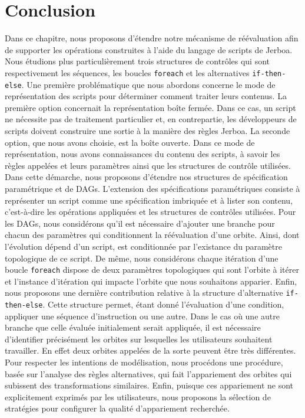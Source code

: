 \section{Conclusion}
\label{sec:reevaluation-scripts-conclusion}

Dans ce chapitre, nous proposons d'étendre notre mécanisme de réévaluation afin
de supporter les opérations construites à l'aide du langage de scripts de
Jerboa. %
Nous étudions plus particulièrement trois structures de contrôles qui sont
respectivement les séquences, les boucles \texttt{foreach} et les alternatives
\texttt{if-then-else}. %
Une première problématique que nous abordons concerne le mode de représentation
des scripts pour déterminer comment traiter leurs contenus. %
La première option concernait la représentation boîte fermée. %
Dans ce cas, un script ne nécessite pas de traitement particulier et, en
contrepartie, les développeurs de scripts doivent construire une sortie à la
manière des règles Jerboa. %
La seconde option, que nous avons choisie, est la boîte ouverte. %
Dans ce mode de représentation, nous avons connaissances du contenu des scripts,
à savoir les règles appelées et leurs paramètres ainsi que les structures de
contrôle utilisées. %
Dans cette démarche, nous proposons d'étendre nos structures de spécification
paramétrique et de DAGs. %
L'extension des spécifications paramétriques consiste à représenter un script
comme une spécification imbriquée et à lister son contenu, c'est-à-dire les
opérations appliquées et les structures de contrôles utilisées. %
Pour les DAGs, nous considérons qu'il est nécessaire d'ajouter une branche pour
chacun des paramètres qui conditionnent la réévaluation d'une orbite. %
Ainsi, dont l'évolution dépend d'un script, est conditionnée par l'existance du
paramètre topologique de ce script. %
De même, nous considérons chaque itération d'une boucle \texttt{foreach} dispose
de deux paramètres topologiques qui sont l'orbite à itérer et l'instance
d'itération qui impacte l'orbite que nous souhaitons apparier. %
Enfin, nous proposons une dernière contribution relative à la structure
d'alternative \texttt{if-then-else}. %
Cette structure permet, étant donné l'évaluation d'une condition, appliquer une
séquence d'instruction ou une autre. %
Dans le cas où une autre branche que celle évaluée initialement serait
appliquée, il est nécessaire d'identifier précisément les orbites sur lesquelles
les utilisateurs souhaitent travailler. %
En effet deux orbites appelées de la sorte peuvent être très différentes. %
Pour respecter les intentions de modélisation, nous procédons une procédure,
basée sur l'analyse des règles alternatives, qui fait l'appariement des orbites
qui subissent des transformations similaires. %
Enfin, puisque ces appariement ne sont explicitement exprimés par les
utilisateurs, nous proposons la sélection de stratégies pour configurer la
qualité d'appariement recherchée. %
